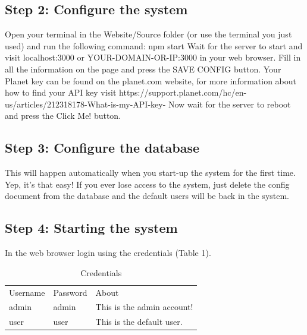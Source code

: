 \documentclass[a4paper]{article}
\begin{document}
\subsection{Step 2: Configure the system}
Open your terminal in the Website/Source folder (or use the terminal you just used) and run the following command:
\newline
npm start
\newline
\newline
Wait for the server to start and visit localhost:3000 or YOUR-DOMAIN-OR-IP:3000 in your web browser.
\newline
Fill in all the information on the page and press the SAVE CONFIG button.
\newline
Your Planet key can be found on the planet.com website, for more information about how to find your API key visit https://support.planet.com/hc/en-us/articles/212318178-What-is-my-API-key-
\newline
\newline
Now wait for the server to reboot and press the Click Me! button.
\newline

\subsection{Step 3: Configure the database}
This will happen automatically when you start-up the system for the first time.
\newline
\newline
Yep, it's that easy!
\newline
If you ever lose access to the system, just delete the config document from the database and the default users will be back in the system.
\newline

\subsection{Step 4: Starting the system}
In the web browser login using the credentials (Table 1).
\newline
\begin{table}[htb]
\centering
\caption{Credentials}
\label{my-label}
\begin{tabular}{lll}
Username & Password & About                      \\
admin    & admin    & This is the admin account! \\
user     & user     & This is the default user. 
\end{tabular}
\end{table}
\end{document}
